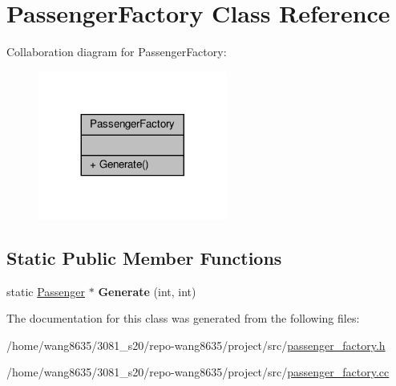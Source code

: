 \hypertarget{classPassengerFactory}{}\section{Passenger\+Factory Class Reference}
\label{classPassengerFactory}


Collaboration diagram for Passenger\+Factory\+:
\nopagebreak
\begin{figure}[H]
\begin{center}
\leavevmode
\includegraphics[width=176pt]{classPassengerFactory__coll__graph}
\end{center}
\end{figure}
\subsection*{Static Public Member Functions}
\begin{DoxyCompactItemize}
\item 
\mbox{\label{classPassengerFactory_a2952ba78ceb285f445bc768d287230d2}} 
static \hyperlink{classPassenger}{Passenger} $\ast$ {\bfseries Generate} (int, int)
\end{DoxyCompactItemize}


The documentation for this class was generated from the following files\+:\begin{DoxyCompactItemize}
\item 
/home/wang8635/3081\+\_\+s20/repo-\/wang8635/project/src/\hyperlink{passenger__factory_8h}{passenger\+\_\+factory.\+h}\item 
/home/wang8635/3081\+\_\+s20/repo-\/wang8635/project/src/\hyperlink{passenger__factory_8cc}{passenger\+\_\+factory.\+cc}\end{DoxyCompactItemize}
